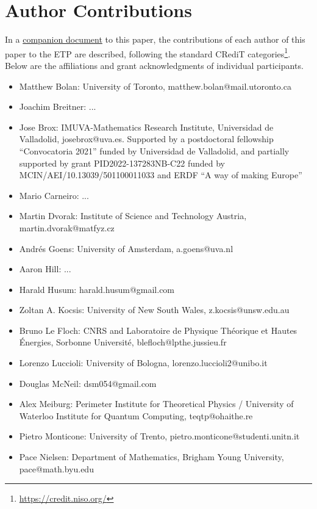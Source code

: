 \section{Author Contributions}

In a \href{https://github.com/teorth/equational_theories/blob/main/paper/contributions.md}{companion document} to this paper, the contributions of each author of this paper to the ETP are described, following the standard CRediT categories\footnote{\url{https://credit.niso.org/}}.  Below are the affiliations and grant acknowledgments of individual participants. 


\begin{itemize}
    \item Matthew Bolan: University of Toronto, matthew.bolan@mail.utoronto.ca
    \item Joachim Breitner: ...
    \item Jose Brox: IMUVA-Mathematics Research Institute, Universidad de Valladolid, josebrox@uva.es. Supported by a postdoctoral fellowship “Convocatoria 2021” funded by Universidad de Valladolid, and partially supported by grant PID2022-137283NB-C22 funded by MCIN/AEI/10.13039/501100011033 and ERDF “A way of making Europe”
    \item Mario Carneiro: ...
    \item Martin Dvorak: Institute of Science and Technology Austria, martin.dvorak@matfyz.cz
    \item Andr\'es Goens: University of Amsterdam, a.goens@uva.nl
    \item Aaron Hill: ...
    \item Harald Husum: harald.husum@gmail.com
    \item Zoltan A. Kocsis: University of New South Wales, z.kocsis@unsw.edu.au
    \item Bruno Le Floch: CNRS and Laboratoire de Physique Th\'eorique et Hautes \'Energies, Sorbonne Universit\'e, blefloch@lpthe.jussieu.fr
    \item Lorenzo Luccioli: University of Bologna, lorenzo.luccioli2@unibo.it
    \item Douglas McNeil: dsm054@gmail.com
    \item Alex Meiburg: Perimeter Institute for Theoretical Physics / University of Waterloo Institute for Quantum Computing, teqtp@ohaithe.re
    \item Pietro Monticone: University of Trento, pietro.monticone@studenti.unitn.it
    \item Pace Nielsen: Department of Mathematics, Brigham Young University, pace@math.byu.edu

\end{itemize}
